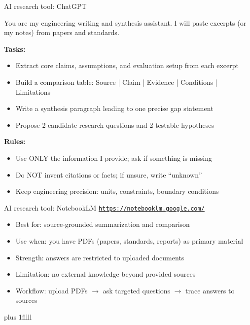 \documentclass[aspectratio=169]{beamer}
\newcommand{\btVFill}{\vskip0pt plus 1filll}
\begin{document}
\begin{frame}{AI research tool: ChatGPT}

You are my engineering writing and synthesis assistant.  
I will paste excerpts (or my notes) from papers and standards.

\medskip
\textbf{Tasks:}
\begin{itemize}
  \item Extract core claims, assumptions, and evaluation setup from each excerpt
  \item Build a comparison table: Source | Claim | Evidence | Conditions | Limitations
  \item Write a synthesis paragraph leading to one precise gap statement
  \item Propose 2 candidate research questions and 2 testable hypotheses
\end{itemize}

\medskip
\textbf{Rules:}
\begin{itemize}
  \item Use ONLY the information I provide; ask if something is missing
  \item Do NOT invent citations or facts; if unsure, write ``unknown''
  \item Keep engineering precision: units, constraints, boundary conditions
\end{itemize}

\end{frame}

\begin{frame}{AI research tool: NotebookLM}
  \href{https://notebooklm.google.com/}{\texttt{https://notebooklm.google.com/}}

\begin{itemize}
  \item Best for: source-grounded summarization and comparison
  \item Use when: you have PDFs (papers, standards, reports) as primary material
  \item Strength: answers are restricted to uploaded documents
  \item Limitation: no external knowledge beyond provided sources
  \item Workflow: upload PDFs $\rightarrow$ ask targeted questions $\rightarrow$ trace answers to sources
\end{itemize}

\btVFill
\end{frame}
\end{document}
